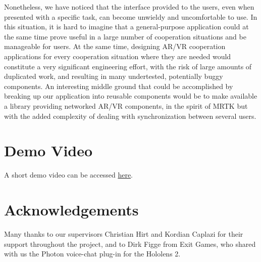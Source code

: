 \documentclass[10pt,twocolumn,letterpaper,english]{article}
\begin{document}
Nonetheless, we have noticed that the interface provided to the users, even when presented with a specific task, can become unwieldy and uncomfortable to use. In this situation, it is hard to imagine that a general-purpose application could at the same time prove useful in a large number of cooperation situations and be manageable for users. At the same time, designing AR/VR cooperation applications for every cooperation situation where they are needed would constitute a very significant engineering effort, with the risk of large amounts of duplicated work, and resulting in many undertested, potentially buggy components. An interesting middle ground that could be accomplished by breaking up our application into reusable components would be to make available a library providing networked AR/VR components, in the spirit of MRTK but with the added complexity of dealing with synchronization between several users.

\section{Demo Video\label{sec:demo_vid}}

A short demo video can be accessed \href{https://drive.google.com/file/d/1BtD-58ZoURA6vvYbpO8RtQwbVprp7i_w/view?usp=sharing}{here}.

\section{Acknowledgements}

Many thanks to our supervisors Christian Hirt and Kordian Caplazi for their support throughout the project, and to Dirk Figge from Exit Games, who shared with us the Photon voice-chat plug-in for the Hololens 2.


\end{document}
